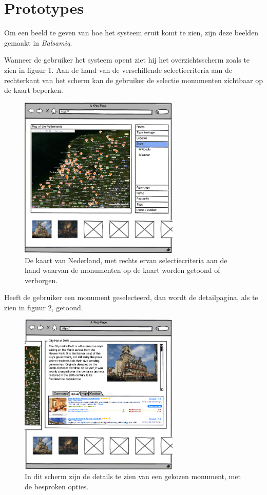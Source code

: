 \documentclass{article}
\begin{document}
\section{Prototypes}
Om een beeld te geven van hoe het systeem eruit komt te zien, zijn deze beelden gemaakt in \emph{Balsamiq}. 

Wanneer de gebruiker het systeem opent ziet hij het overzichtsscherm zoals te zien in figuur 1. Aan de hand van de verschillende selectiecriteria aan de rechterkant van het scherm kan de gebruiker de selectie monumenten zichtbaar op de kaart beperken.
\begin{figure}[htp]
  \centering
  \includegraphics[width=3in]{user-story-overview.png}
  \caption[Het overzichtsscherm]%
  {De kaart van Nederland, met rechts ervan selectiecriteria aan de hand waarvan de monumenten op de kaart worden getoond of verborgen.}
\end{figure}

Heeft de gebruiker een monument geselecteerd, dan wordt de detailpagina, als te zien in figuur 2, getoond. 
\begin{figure}[htp]
  \centering
  \includegraphics[width=3in]{user-story-detail.png}
  \caption[Voorbeeld van een detailpagina van een monument]%
  {In dit scherm zijn de details te zien van een gekozen monument, met de besproken opties.}
\end{figure}
\end{document}
